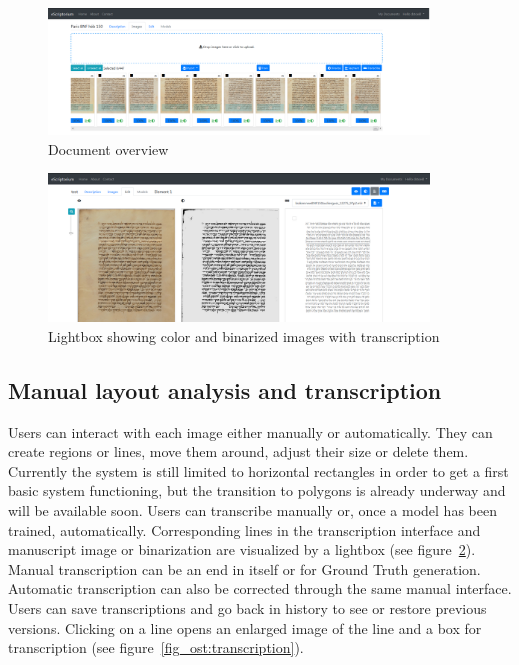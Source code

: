 \begin{figure}
	\centering
	\includegraphics[width=0.9\textwidth]{overview_BNF_150.png}
	\caption{Document overview}
	\label{fig_ost:overview}
\end{figure}

\begin{figure}
	\centering
	\includegraphics[width=0.9\textwidth]{synch_lines.png}
	\caption{Lightbox showing color and binarized images with transcription}
	\label{fig_ost:lightbox}
\end{figure}

\subsection{Manual layout analysis and transcription}

Users can interact with each image either manually or automatically. They can
create regions or lines, move them around, adjust their size or delete them.
Currently the system is still limited to horizontal rectangles in order to get
a first basic system functioning, but the transition to polygons is already
underway and will be available soon. Users can transcribe manually or, once a
model has been trained, automatically. Corresponding lines in the transcription
interface and manuscript image or binarization are visualized by a lightbox
(see figure~\ref{fig_ost:lightbox}). Manual transcription can be an end in itself
or for Ground Truth generation. Automatic transcription can also be corrected
through the same manual interface. Users can save transcriptions and go back in
history to see or restore previous versions. Clicking on a line opens an
enlarged image of the line and a box for transcription (see figure~\ref{fig_ost:transcription}).

